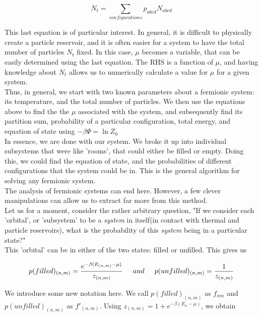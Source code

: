 \documentclass[oneside]{book}
\begin{document}
\[ N_t = \sum_{configurations}^{}p_{abcd}N_{abcd}\]

This last equation is of particular interest. In general, it is difficult to physically create a particle reservoir, and it is often easier for a system to have the total number of particles $N_t$ fixed. In this case, $\mu$ becomes a variable, that can be easily determined using the last equation. The RHS is a function of $\mu$, and having knowledge about $N_t$ allows us to numerically calculate a value for $\mu$ for a given system.\\

Thus, in general, we start with two known parameters about a fermionic system: its temperature, and the total number of particles. We then use the equations above to find the the $\mu$ associated with the system, and subsequently find its partition sum, probability of a particular configuration, total energy, and equation of state using $-\beta\Psi = \ln Z_0$\\

In essence, we are done with our system. We broke it up into individual subsystems that were like 'rooms', that could either be filled or empty. Doing this, we could find the equation of state, and the probabilities of different configurations that the system could be in. This is the general algorithm for solving any fermionic system.\\

The analysis of fermionic systems can end here. However, a few clever manipulations can allow us to extract far more from this method.\\

Let us for a moment, consider the rather arbitrary question, "If we consider each 'orbital', or 'subsystem' to be a \emph{system} in itself(in contact with thermal and particle reservoirs), what is the probability of this \emph{system} being in a particular state?"\\

This 'orbital' can be in either of the two states: filled or unfilled. This gives us

\[p(filled)_{(n,m)} = \frac{e^{-\beta(E_{(n,m)} - \mu)}}{z_{(n,m)}} \hspace{0.5cm}and\hspace{0.5cm}
p(unfilled) _{(n,m)}= \frac{1}{z_{(n,m)}}\]

We introduce some new notation here. We call $p(filled)_{(n,m)}$ as $f_{nm}$ and $p(unfilled) _{(n,m)} $ as $f'_{(n,m)}$. Using $z_{(n,m)} =  1 + e^{-\beta(E_n-\mu)} $, we obtain
\end{document}
